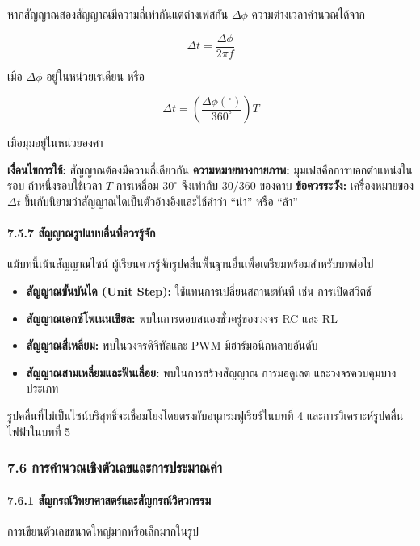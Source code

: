 หากสัญญาณสองสัญญาณมีความถี่เท่ากันแต่ต่างเฟสกัน $\Delta\phi$ ความต่างเวลาคำนวณได้จาก

\[
\Delta t=\frac{\Delta\phi}{2\pi f}
\]

เมื่อ $\Delta\phi$ อยู่ในหน่วยเรเดียน หรือ

\[
\Delta t=\left(\frac{\Delta\phi(^\circ)}{360^\circ}\right)T
\]

เมื่อมุมอยู่ในหน่วยองศา

\textbf{เงื่อนไขการใช้:} สัญญาณต้องมีความถี่เดียวกัน
\textbf{ความหมายทางกายภาพ:} มุมเฟสคือการบอกตำแหน่งในรอบ ถ้าหนึ่งรอบใช้เวลา $T$ การเหลื่อม $30^\circ$ จึงเท่ากับ $30/360$ ของคาบ
\textbf{ข้อควรระวัง:} เครื่องหมายของ $\Delta t$ ขึ้นกับนิยามว่าสัญญาณใดเป็นตัวอ้างอิงและใช้คำว่า “นำ” หรือ “ล้า”

\paragraph{7.5.7 สัญญาณรูปแบบอื่นที่ควรรู้จัก}

แม้บทนี้เน้นสัญญาณไซน์ ผู้เรียนควรรู้จักรูปคลื่นพื้นฐานอื่นเพื่อเตรียมพร้อมสำหรับบทต่อไป

\begin{itemize}
    \item \textbf{สัญญาณขั้นบันได (Unit Step):} ใช้แทนการเปลี่ยนสถานะทันที เช่น การเปิดสวิตช์
    \item \textbf{สัญญาณเอกซ์โพเนนเชียล:} พบในการตอบสนองชั่วครู่ของวงจร RC และ RL
    \item \textbf{สัญญาณสี่เหลี่ยม:} พบในวงจรดิจิทัลและ PWM มีฮาร์มอนิกหลายอันดับ
    \item \textbf{สัญญาณสามเหลี่ยมและฟันเลื่อย:} พบในการสร้างสัญญาณ การมอดูเลต และวงจรควบคุมบางประเภท
\end{itemize}

รูปคลื่นที่ไม่เป็นไซน์บริสุทธิ์จะเชื่อมโยงโดยตรงกับอนุกรมฟูเรียร์ในบทที่ 4 และการวิเคราะห์รูปคลื่นไฟฟ้าในบทที่ 5

 

\subsubsection{7.6 การคำนวณเชิงตัวเลขและการประมาณค่า}

\paragraph{7.6.1 สัญกรณ์วิทยาศาสตร์และสัญกรณ์วิศวกรรม}

การเขียนตัวเลขขนาดใหญ่มากหรือเล็กมากในรูป

